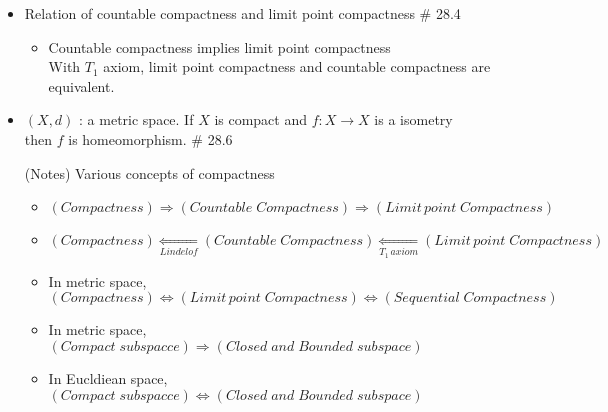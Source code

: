 \documentclass[12pt]{article}
\begin{document}
\begin{itemize}
\begin{itemize}
	\end{itemize} 
	\item Relation of countable compactness and limit point compactness \quad \# 28.4
	\begin{itemize}
		\item Countable compactness implies limit point compactness
		\\ With $T_1$ axiom, limit point compactness and countable compactness are equivalent.
	\end{itemize}
	\item $(X,d)$ : a metric space. If $X$ is compact and $f: X\rightarrow X$ is a isometry\\ then $f$ is homeomorphism. \quad \# 28.6
	\\
	\item[(Notes)] Various concepts of compactness
	\begin{itemize}
		\item $(Compactness)\Rightarrow (Countable\; Compactness)\Rightarrow (Limit\, point\; Compactness)$
		\item $(Compactness)\underset{Lindelof}{\Leftarrow} (Countable\; Compactness)\underset{T_1\, axiom}{\Leftarrow}(Limit\, point\; Compactness)$
		\item In metric space, $(Compactness)\Leftrightarrow(Limit\, point\; Compactness)\Leftrightarrow(Sequential \; Compactness) $
		\item In metric space, $(Compact\; subspacce)\Rightarrow (Closed\; and \;Bounded \;subspace)$
		\item In Eucldiean space, $(Compact \;subspacce)\Leftrightarrow (Closed \;and \;Bounded \;subspace)$
	\end{itemize}  
\end{itemize}
\bigskip
\end{document}
